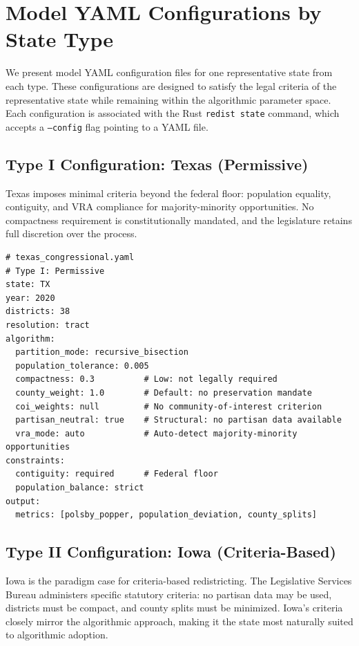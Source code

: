 \section{Model YAML Configurations by State Type}
\label{sec:configs}

We present model YAML configuration files for one representative state from each type. These configurations are designed to satisfy the legal criteria of the representative state while remaining within the algorithmic parameter space. Each configuration is associated with the Rust \texttt{redist state} command, which accepts a \texttt{--config} flag pointing to a YAML file.

\subsection{Type I Configuration: Texas (Permissive)}

Texas imposes minimal criteria beyond the federal floor: population equality, contiguity, and VRA compliance for majority-minority opportunities. No compactness requirement is constitutionally mandated, and the legislature retains full discretion over the process.

\begin{verbatim}
# texas_congressional.yaml
# Type I: Permissive
state: TX
year: 2020
districts: 38
resolution: tract
algorithm:
  partition_mode: recursive_bisection
  population_tolerance: 0.005
  compactness: 0.3          # Low: not legally required
  county_weight: 1.0        # Default: no preservation mandate
  coi_weights: null         # No community-of-interest criterion
  partisan_neutral: true    # Structural: no partisan data available
  vra_mode: auto            # Auto-detect majority-minority opportunities
constraints:
  contiguity: required      # Federal floor
  population_balance: strict
output:
  metrics: [polsby_popper, population_deviation, county_splits]
\end{verbatim}

\subsection{Type II Configuration: Iowa (Criteria-Based)}

Iowa is the paradigm case for criteria-based redistricting. The Legislative Services Bureau administers specific statutory criteria: no partisan data may be used, districts must be compact, and county splits must be minimized. Iowa's criteria closely mirror the algorithmic approach, making it the state most naturally suited to algorithmic adoption.

